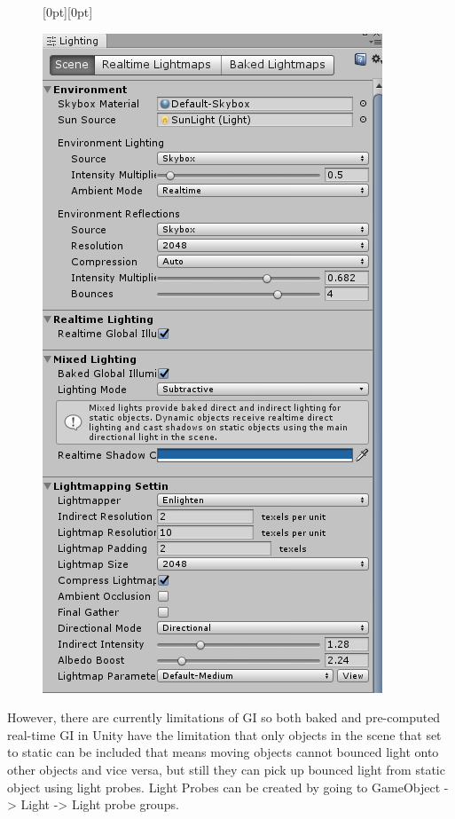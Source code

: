 \documentclass[a4paper, 13pt]{extarticle}
\begin{document}
{ \newpage
 \begin{figure}[h]
 	\raisebox{-50mm}[0pt][0pt]{
 	\begin{minipage}{1\textwidth}
 		\centering
 		\includegraphics[width=0.3\linewidth]{intructions/lighting_setting.png}
 		\centering
 	\end{minipage}
}
 \end{figure}
\vspace{100mm}
 However, there are currently limitations of GI so both baked and pre-computed real-time GI in Unity have the limitation that only objects in the scene that set to static can be included that means moving objects cannot bounced light onto other objects and vice versa, but still they can pick up bounced light from static object using light probes. Light Probes can be created by going to GameObject -> Light -> Light probe groups.
 
}
\end{document}
